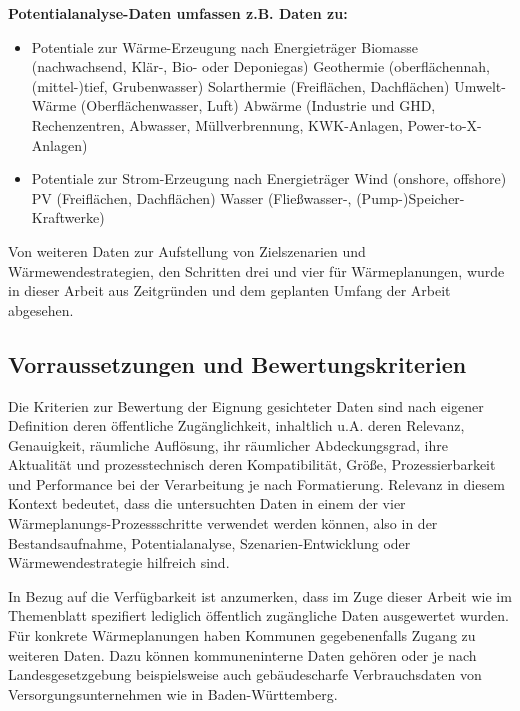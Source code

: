 			\textbf{Potentialanalyse-Daten umfassen z.B. Daten zu:}
			\begin{itemize}
				\item Potentiale zur Wärme-Erzeugung nach Energieträger
				\subitem Biomasse (nachwachsend, Klär-, Bio- oder Deponiegas)
				\subitem Geothermie (oberflächennah, (mittel-)tief, Grubenwasser)
				\subitem Solarthermie (Freiflächen, Dachflächen)
				\subitem Umwelt-Wärme (Oberflächenwasser, Luft)
				\subitem Abwärme (Industrie und GHD, Rechenzentren, Abwasser, Müllverbrennung, KWK-Anlagen, Power-to-X-Anlagen)
				\item Potentiale zur Strom-Erzeugung nach Energieträger
					\subitem Wind (onshore, offshore)
					\subitem PV (Freiflächen, Dachflächen)
					\subitem Wasser (Fließwasser-, (Pump-)Speicher-Kraftwerke)
			\end{itemize}	
			
			Von weiteren Daten zur Aufstellung von Zielszenarien und Wärmewendestrategien, den Schritten drei und vier für Wärmeplanungen, wurde in dieser Arbeit aus Zeitgründen und dem geplanten Umfang der Arbeit abgesehen. 
			
		\subsection{Vorraussetzungen und Bewertungskriterien}
		\label{sec:Daten:Aquise:Bewertungskriterien}
			Die Kriterien zur Bewertung der Eignung gesichteter Daten sind nach eigener Definition deren öffentliche Zugänglichkeit, inhaltlich u.A. deren Relevanz, Genauigkeit, räumliche Auflösung, ihr räumlicher Abdeckungsgrad, ihre Aktualität und prozesstechnisch deren Kompatibilität, Größe, Prozessierbarkeit und Performance bei der Verarbeitung je nach Formatierung. Relevanz in diesem Kontext bedeutet, dass die untersuchten Daten in einem der vier Wärmeplanungs-Prozessschritte verwendet werden können, also in der Bestandsaufnahme, Potentialanalyse, Szenarien-Entwicklung oder Wärmewendestrategie hilfreich sind. 
			
			In Bezug auf die Verfügbarkeit ist anzumerken, dass im Zuge dieser Arbeit wie im Themenblatt spezifiert lediglich öffentlich zugängliche Daten ausgewertet wurden. Für konkrete Wärmeplanungen haben Kommunen gegebenenfalls Zugang zu weiteren Daten. Dazu können kommuneninterne Daten gehören oder je nach Landesgesetzgebung beispielsweise auch gebäudescharfe Verbrauchsdaten von Versorgungsunternehmen wie in Baden-Württemberg. 
			
